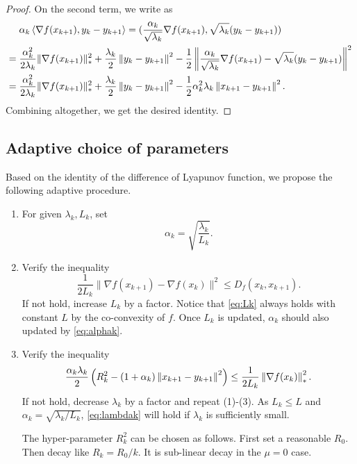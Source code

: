 \documentclass[10pt]{amsart}
\begin{document}
\begin{proof}
On the second term, we write as
$$
\begin{aligned}
&\alpha_k \left\langle {\nabla f(x_{k+1}), y_k - y_{k+1}} \right\rangle ={} (\frac{\alpha_k}{\sqrt{\lambda_k}}\nabla f(x_{k+1}), \sqrt{\lambda_k}(y_k - y_{k+1}))\\
={}& \frac{\alpha_k^2}{2\lambda_k} \| \nabla f(x_{k+1})\|_*^2 + \frac{\lambda_k}{2}\left\lVert {y_k - y_{k+1}} \right\rVert^2 - \frac{1}{2}\left\lVert { \frac{\alpha_k}{\sqrt{\lambda_k}}\nabla f(x_{k+1}) - \sqrt{\lambda_k} (y_{k} - y_{k+1})} \right\rVert^2\\
={}& \frac{\alpha_k^2}{2\lambda_k} \| \nabla f(x_{k+1})\|_*^2 + \frac{\lambda_k}{2}\left\lVert {y_k - y_{k+1}} \right\rVert^2 - \frac{1}{2}\alpha_k^2\lambda_k\left\lVert { x_{k+1} - y_{k+1}} \right\rVert^2.
\end{aligned}
$$
Combining altogether, we get the desired identity. 
\end{proof}

\subsection{Adaptive choice of parameters}
Based on the identity of the difference of Lyapunov function, we propose the following adaptive procedure. 
\begin{enumerate}
\item For given $\lambda_k, L_k$, set 
\begin{equation}\label{eq:alphak}
\alpha_k = \sqrt{\frac{\lambda_k}{L_k}}. 
\end{equation}

\item Verify the inequality
\begin{equation}\label{eq:Lk}
\frac{1}{2L_k}\| \nabla f(x_{k+1}) - \nabla f(x_k) \|^2 \leq D_f(x_{k}, x_{k+1}).
\end{equation}
If not hold, increase $L_k$ by a factor. Notice that \eqref{eq:Lk} always holds with constant $L$ by the co-convexity of $f$. Once $L_k$ is updated, $\alpha_k$ should also updated by \eqref{eq:alphak}.

\item Verify the inequality
\begin{equation}\label{eq:lambdak}
 \frac{\alpha_k\lambda_k}{2}\left (R_k^2 - (1+\alpha_k)\left\lVert {x_{k+1}-y_{k+1}} \right\rVert^2\right ) \leq \frac{1}{2L_k}\left\lVert {\nabla f(x_k)} \right\rVert_*^2.
\end{equation}
If not hold, decrease $\lambda_k$ by a factor and repeat (1)-(3). As $L_k \leq L$ and $\alpha_k = \sqrt{\lambda_k/L_k}$, \eqref{eq:lambdak} will hold if $\lambda_k$ is sufficiently small.  

The hyper-parameter $R_k^2$ can be chosen as follows. First set a reasonable $R_0$. Then decay like $R_k = R_0/k$. It is sub-linear decay in the $\mu = 0$ case.
\end{enumerate}
\end{document}
